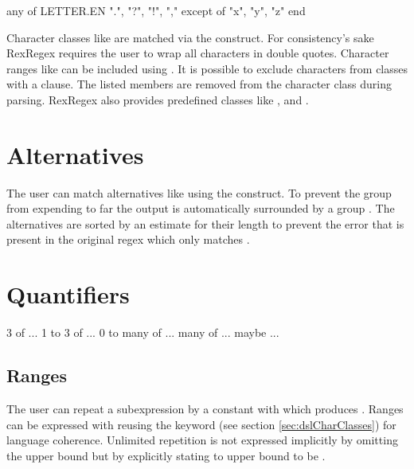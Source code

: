 \begin{rexregexBox}[label=code:dslCharClasses,title=Character classes,width=10cm,center]
any of
    LETTER.EN
    ".", "?", "!", ","
except of
    "x", "y", "z"
end
\end{rexregexBox}

Character classes like \pattern{[abc]} are matched via the  construct. For consistency's sake RexRegex requires the user to wrap all characters in double quotes. Character ranges like \pattern{[a-z]} can be included using . It is possible to exclude characters from classes with a  clause. The listed members are removed from the character class during parsing. RexRegex also provides predefined classes like ,  and . 

\section{Alternatives}

The user can match alternatives like  using the  construct. To prevent the group from expending to far the output is automatically surrounded by a group . The alternatives are sorted by an estimate for their length to prevent the error that is present in the original regex which only matches .

\section{Quantifiers}

\begin{rexregexBox}[title={Quantifiers in RexRegex},label=code:quantifiersInRexRegex,width=10cm,center]
3 of ...
1 to 3 of ...
0 to many of ...
many of ...
maybe ...
\end{rexregexBox}

\subsection{Ranges} \label{sec:dslQuantifierRanges}

The user can repeat a subexpression by a constant with  which produces . Ranges can be expressed with  reusing the  keyword (see section \ref{sec:dslCharClasses}) for language coherence. Unlimited repetition is not expressed implicitly by omitting the upper bound  but by explicitly stating to upper bound to be .

